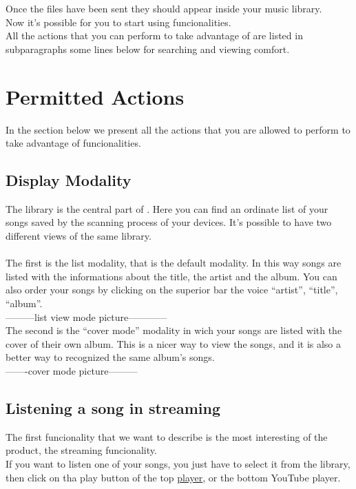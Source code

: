 Once the files have been sent they should appear inside your music library.\\
Now it's possible for you to start using  funcionalities.\\
All the actions that you can perform to take advantage of  are listed
in subparagraphs some lines below for searching and viewing comfort.


\section{Permitted Actions}
In the section below we present all the actions that you are allowed to perform
to take advantage of  funcionalities.

\subsection{Display Modality}

The library is the central part of . Here you can find an ordinate
list of your songs saved by the scanning process of your devices. It's possible
to have two different views of the same library.\\
\\
The first is the list modality, that is the default modality. In this
way songs are listed with the informations about the title, the artist and the
album. You can also order your songs by clicking on the superior bar the voice
``artist'', ``title'', ``album''.\\

---------list view mode picture------------
\\

The second is the ``cover mode'' modality in wich your songs are listed with the
cover of their own album. This is a nicer way to view the songs, and it is also
a better way to recognized the same album's songs.\\

-------cover mode picture---------
\\

 \subsection*{Listening a song in streaming}

The first funcionality that we want to describe is the most interesting of the
product, the streaming funcionality.\\
If you want to listen one of your songs, you just have to select it from the
library, then click on tha play button of the top \underline{player}, or the
bottom YouTube player.\\

